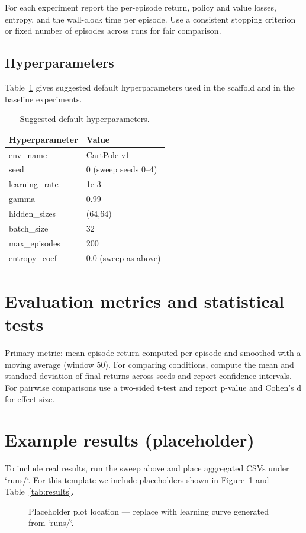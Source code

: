 \documentclass[11pt]{article}
\begin{document}
For each experiment report the per-episode return, policy and value losses,
entropy, and the wall-clock time per episode. Use a consistent stopping
criterion or fixed number of episodes across runs for fair comparison.

\subsection{Hyperparameters}
Table~\ref{tab:hparams} gives suggested default hyperparameters used in the
scaffold and in the baseline experiments.

\begin{table}[h]
\centering
\begin{tabular}{@{}ll@{}}\toprule
Hyperparameter & Value \\\midrule
env_name & CartPole-v1 \\
seed & 0 (sweep seeds 0–4) \\
learning_rate & 1e-3 \\
gamma & 0.99 \\
hidden_sizes & (64,64) \\
batch_size & 32 \\
max_episodes & 200 \\
entropy_coef & 0.0 (sweep as above) \\
\bottomrule
\end{tabular}
\caption{Suggested default hyperparameters.}
\label{tab:hparams}
\end{table}

\section{Evaluation metrics and statistical tests}
Primary metric: mean episode return computed per episode and smoothed with a
moving average (window 50). For comparing conditions, compute the mean and
standard deviation of final returns across seeds and report confidence
intervals. For pairwise comparisons use a two-sided t-test and report p-value
and Cohen's d for effect size.

\section{Example results (placeholder)}
To include real results, run the sweep above and place aggregated CSVs under
`runs/`. For this template we include placeholders shown in
Figure~\ref{fig:placeholder} and Table~\ref{tab:results}.

\begin{figure}[h]
\centering
{}
\caption{Placeholder plot location — replace with learning curve generated from `runs/`.}
\label{fig:placeholder}
\end{figure}
\end{document}
